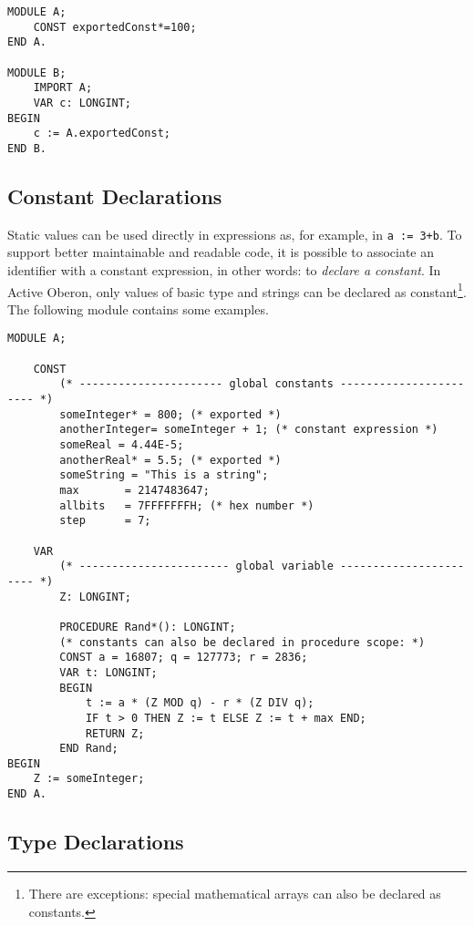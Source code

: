 \documentclass[a4wide,11pt]{article}
\begin{document}
\begin{lstlisting}[language=Oberon,frame=none,caption={B imports A}]
MODULE A;
    CONST exportedConst*=100;
END A.

MODULE B;
    IMPORT A;
    VAR c: LONGINT;
BEGIN
    c := A.exportedConst;
END B.
\end{lstlisting}

\subsection{Constant Declarations}
Static values can be used directly in expressions as, for example, in \verb~a := 3+b~. To support better maintainable and readable code, it is possible to associate an identifier with a constant expression, in other words: to {\em declare a constant}. In Active Oberon, only values of basic type and strings can be declared as constant\footnote{There are exceptions: special mathematical arrays can also be declared as constants.}. The following module contains some examples.

\begin{lstlisting}[language=Oberon,frame=none,caption={Declaration and Usage of Constants}]
MODULE A;

    CONST 
        (* ---------------------- global constants ----------------------- *) 
        someInteger* = 800; (* exported *) 
        anotherInteger= someInteger + 1; (* constant expression *) 
        someReal = 4.44E-5;
        anotherReal* = 5.5; (* exported *) 
        someString = "This is a string"; 
        max       = 2147483647;
        allbits   = 7FFFFFFFH; (* hex number *) 
        step      = 7;
        
    VAR 
        (* ----------------------- global variable ----------------------- *) 
        Z: LONGINT; 
        
        PROCEDURE Rand*(): LONGINT;
        (* constants can also be declared in procedure scope: *) 
        CONST a = 16807; q = 127773; r = 2836; 
        VAR t: LONGINT;
        BEGIN
            t := a * (Z MOD q) - r * (Z DIV q);
            IF t > 0 THEN Z := t ELSE Z := t + max END;
            RETURN Z;
        END Rand;
BEGIN 
    Z := someInteger; 
END A.
\end{lstlisting}

\subsection{Type Declarations}
\end{document}
